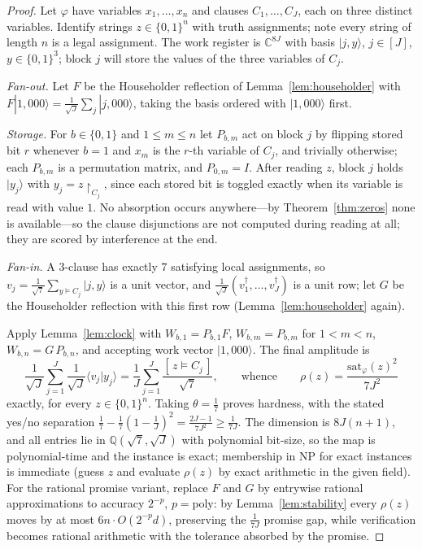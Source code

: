 \documentclass[11pt]{amsart}
\theoremstyle{definition}
\theoremstyle{remark}
\newcommand{\C}{\mathbb{C}}
\newcommand{\Q}{\mathbb{Q}}
\begin{document}
\begin{proof}
Let $\varphi$ have variables $x_1,\dots,x_n$ and clauses
$C_1,\dots,C_J$, each on three distinct variables. Identify strings
$z\in\{0,1\}^n$ with truth assignments; note every string of length
$n$ is a legal assignment. The work register is $\C^{8J}$ with basis
$|j,y\rangle$, $j\in[J]$, $y\in\{0,1\}^3$; block $j$ will store the
values of the three variables of $C_j$.

\emph{Fan-out.} Let $F$ be the Householder reflection of
Lemma~\ref{lem:householder} with
$F|1,000\rangle=\frac1{\sqrt J}\sum_j|j,000\rangle$, taking the
basis ordered with $|1,000\rangle$ first.

\emph{Storage.} For $b\in\{0,1\}$ and $1\le m\le n$ let $P_{b,m}$ act
on block $j$ by flipping stored bit $r$ whenever $b=1$ and $x_m$ is
the $r$-th variable of $C_j$, and trivially otherwise; each $P_{b,m}$
is a permutation matrix, and $P_{0,m}=I$. After reading $z$, block
$j$ holds $|y_j\rangle$ with $y_j=z\!\restriction_{C_j}$, since each
stored bit is toggled exactly when its variable is read with value
$1$. No absorption occurs anywhere---by
Theorem~\ref{thm:zeros} none is available---so the clause
disjunctions are not computed during reading at all; they are scored
by interference at the end.

\emph{Fan-in.} A $3$-clause has exactly $7$ satisfying local
assignments, so
$v_j=\frac1{\sqrt7}\sum_{y\models C_j}|j,y\rangle$ is a unit vector,
and $\frac1{\sqrt J}(v_1^\dagger,\dots,v_J^\dagger)$ is a unit row;
let $G$ be the Householder reflection with this first row
(Lemma~\ref{lem:householder} again).

Apply Lemma~\ref{lem:clock} with $W_{b,1}=P_{b,1}F$,
$W_{b,m}=P_{b,m}$ for $1<m<n$, $W_{b,n}=G\,P_{b,n}$, and accepting
work vector $|1,000\rangle$. The final amplitude is
\[
  \frac1{\sqrt J}\sum_{j=1}^J\frac1{\sqrt J}\langle v_j|y_j\rangle
  =\frac1J\sum_{j=1}^J\frac{[\,z\models C_j\,]}{\sqrt7},
  \qquad\text{whence}\qquad
  \rho(z)=\frac{\mathrm{sat}_\varphi(z)^2}{7J^2}
\]
exactly, for every $z\in\{0,1\}^n$. Taking $\theta=\frac17$ proves
hardness, with the stated yes/no separation
$\frac17-\frac17(1-\frac1J)^2=\frac{2J-1}{7J^2}\ge\frac1{7J}$. The
dimension is $8J(n+1)$, and all entries lie in $\Q(\sqrt7,\sqrt J)$
with polynomial bit-size, so the map is polynomial-time and the
instance is exact; membership in NP for exact instances is immediate
(guess $z$ and evaluate $\rho(z)$ by exact arithmetic in the given
field). For the rational promise variant, replace $F$ and $G$ by
entrywise rational approximations to accuracy $2^{-p}$,
$p=\mathrm{poly}$: by Lemma~\ref{lem:stability} every $\rho(z)$
moves by at most $6n\cdot O(2^{-p}d)$, preserving the $\frac1{7J}$
promise gap, while verification becomes rational arithmetic with the
tolerance absorbed by the promise.
\end{proof}
\end{document}

